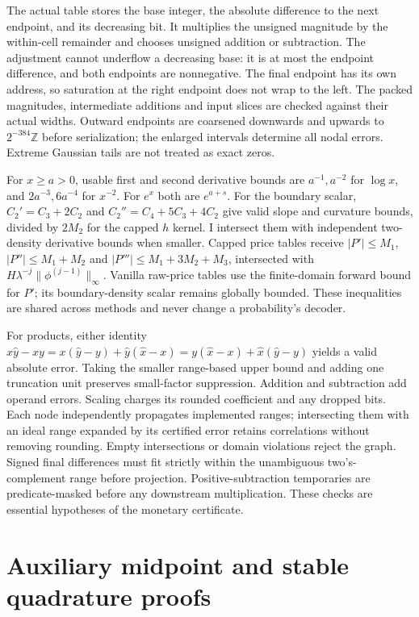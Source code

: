 \documentclass[11pt]{article}
\begin{document}
The actual table stores the base integer, the absolute difference to the
next endpoint, and its decreasing bit.  It multiplies the unsigned magnitude
by the within-cell remainder and chooses unsigned addition or subtraction.
The adjustment cannot underflow a decreasing base: it is at most the
endpoint difference, and both endpoints are nonnegative.
The final endpoint has its own address, so saturation at the right endpoint
does not wrap to the left.  The packed magnitudes, intermediate additions
and input slices are checked against their actual widths.
Outward endpoints are coarsened downwards and upwards to
$2^{-384}\mathbb Z$ before serialization; the enlarged intervals determine
all nodal errors.  Extreme Gaussian tails are not treated as exact zeros.

For $x\geq a>0$, usable first and second derivative bounds are
$a^{-1},a^{-2}$ for $\log x$, and $2a^{-3},6a^{-4}$ for $x^{-2}$.
For $e^x$ both are $e^{a+s}$.
For the boundary scalar,
$C_2'=C_3+2C_2$ and $C_2''=C_4+5C_3+4C_2$ give valid slope and
curvature bounds, divided by $2M_2$ for the capped $h$ kernel.
I intersect them with independent two-density derivative bounds when
smaller. Capped price tables receive $|P'|\leq M_1$,
$|P''|\leq M_1+M_2$ and $|P'''|\leq M_1+3M_2+M_3$, intersected with
$H\lambda^{-j}\|\phi^{(j-1)}\|_\infty$.
Vanilla raw-price tables use the finite-domain forward bound for $P'$;
its boundary-density scalar remains globally bounded. These inequalities
are shared across methods and never change a probability's decoder.

For products, either identity
$\widehat x\widehat y-xy=x(\widehat y-y)+\widehat y(\widehat x-x)
=y(\widehat x-x)+\widehat x(\widehat y-y)$ yields a valid absolute error.
Taking the smaller range-based upper bound and adding one truncation unit
preserves small-factor suppression.  Addition and subtraction add operand
errors.  Scaling charges its rounded coefficient and any dropped bits.
Each node independently propagates implemented ranges; intersecting them
with an ideal range expanded by its certified error retains correlations
without removing rounding.  Empty intersections or domain violations reject
the graph.  Signed final differences must fit strictly within the
unambiguous two's-complement range before projection.  Positive-subtraction
temporaries are predicate-masked before any downstream multiplication.
These checks are essential hypotheses of the monetary certificate.

\section{Auxiliary midpoint and stable quadrature proofs}
\label{app:aux}
\end{document}
